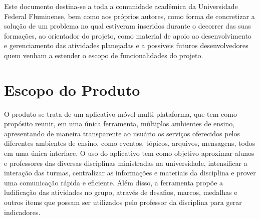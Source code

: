 Este documento destina-se a toda a comunidade acadêmica da Universidade Federal Fluminense, bem como aos próprios autores, como forma de concretizar a solução de um problema no qual estiveram inseridos durante o decorrer das suas formações, ao orientador do projeto, como material de apoio ao desenvolvimento e gerenciamento das atividades planejadas e a possíveis futuros desenvolvedores quem venham a estender o escopo de funcionalidades do projeto.

\section{Escopo do Produto}

O produto se trata de um aplicativo móvel multi-plataforma, que tem como propósito reunir, em uma única ferramenta, múltiplos ambientes de ensino, apresentando de maneira transparente ao usuário os serviços oferecidos pelos diferentes ambientes de ensino, como eventos, tópicos, arquivos, mensagens, todos em uma única interface.
O uso do aplicativo tem como objetivo aproximar alunos e professores das diversas disciplinas ministradas na universidade, intensificar a interação das turmas, centralizar as informações e materiais da disciplina e prover uma comunicação rápida e eficiente. Além disso, a ferramenta  propõe a ludificação das atividades no grupo, através de desafios, marcos, medalhas e outros items que possam ser utilizados pelo professor da disciplina para gerar indicadores.